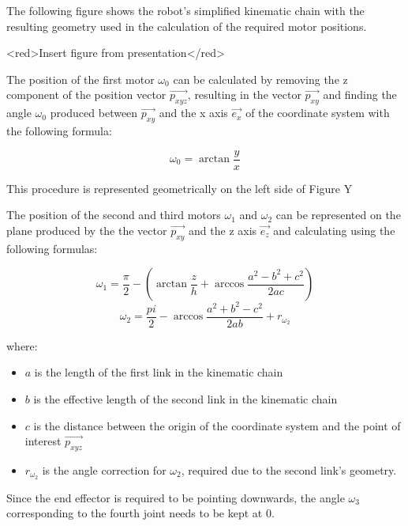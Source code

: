 



The following figure shows the robot's simplified kinematic chain with the resulting geometry used in the calculation of the required motor positions.


<red>Insert figure from presentation</red>

The position of the first motor $\omega_0$ can be calculated by removing the z component of the position vector $\vec{p_{xyz}}$, resulting in the vector $\vec{p_{xy}}$ and finding the angle $\omega_0$ produced between $\vec{p_{xy}}$ and the x axis $\vec{e_x}$ of the coordinate system with the following formula:

$$\omega_0=\arctan{\frac{y}{x}}$$

This procedure is represented geometrically on the left side of Figure Y

The position of the second and third motors $\omega_1$ and $\omega_2$ can be represented on the plane produced by the the vector $\vec{p_{xy}}$ and the z axis $\vec{e_z}$ and calculating using the following formulas:

$$\omega_1=\frac{\pi}{2} - (\arctan{\frac{z}{h}} + \arccos{\frac{a^2-b^2+c^2}{2ac}})$$
$$\omega_2 = \frac{pi}{2} - \arccos{\frac{a^2+b^2-c^2}{2ab}} + r_{\omega_2}$$


where:
\begin{itemize}
    \item $a$ is the length of the first link in the kinematic chain
    \item $b$ is the effective length of the second link in the kinematic chain
    \item $c$ is the distance between the origin of the coordinate system and the point of interest $\vec{p_{xyz}}$
    \item $r_{\omega_2}$ is the angle correction for $\omega_2$, required due to the second link's geometry.
\end{itemize}
Since the end effector is required to be pointing downwards, the angle $\omega_3$ corresponding to the fourth joint needs to be kept at 0.

